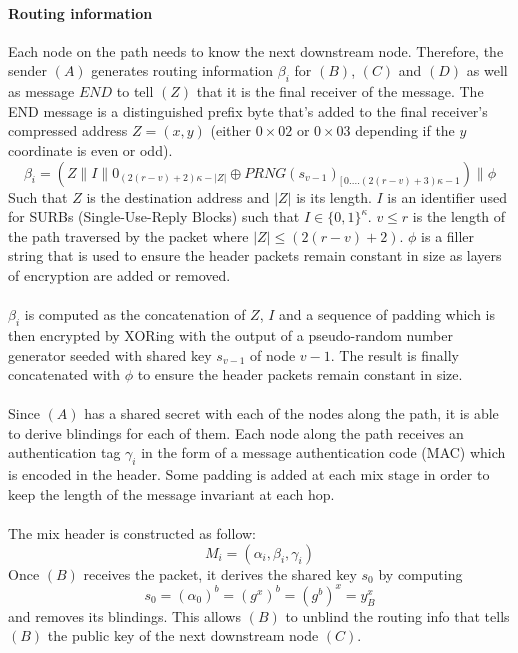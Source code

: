     \paragraph{Routing information}
    Each node on the path needs to know the next downstream node. Therefore, the sender $(A)$ generates routing information $\beta_i$ for $(B)$, $(C)$ and $(D)$ as well as message $END$ to tell $(Z)$ that it is the final receiver of the message. The END message is a distinguished prefix byte that's added to the final receiver's compressed address $Z=(x,y)$ (either $0\times02$ or $0\times03$ depending if the $y$ coordinate is even or odd).
    $$\beta_i=(Z\|I\|0_{(2(r-v)+2)\kappa-|Z|}\oplus PRNG(s_{v-1})_{[ \,0....(2(r-v)+3)\kappa-1})\|\phi$$
    Such that $Z$ is the destination address and $|Z|$ is its length. $I$ is an identifier used for SURBs (Single-Use-Reply Blocks) such that $I \in \{0, 1\}^\kappa$.
$v\leq r$ is the length of the path traversed by the packet where $|Z| \leq (2(r - v) + 2)$. $\phi$ is a filler string that is used to ensure the header packets remain constant in size as layers of encryption are added or removed.
\\~\\$\beta_i$ is computed as the concatenation of $Z$, $I$ and a sequence of padding which is then encrypted by XORing with the output of a pseudo-random number generator seeded with shared key $s_{v-1}$ of node $v-1$. The result is finally concatenated with $\phi$ to ensure the header packets remain constant in size.
\\~\\Since $(A)$ has a shared secret with each of the nodes along the path, it is able to derive blindings for each of them.
\newline Each node along the path receives an authentication tag $\gamma_i$ in the form of a message authentication code (MAC)
which is encoded in the header.
\newline Some padding is added at each mix stage in order to keep the length of the message invariant at each hop.
\\~\\The mix header is constructed as follow: $$M_i=(\alpha_i,\beta_i,\gamma_i)$$
\newline Once $(B)$ receives the packet, it derives the shared key $s_0$ by computing $$s_0=(\alpha_0)^b=(g^x)^b=(g^b)^x=y^x_B$$ and removes its blindings. This allows $(B)$ to unblind the routing info that tells $(B)$ the public key of the next downstream node $(C)$. 
